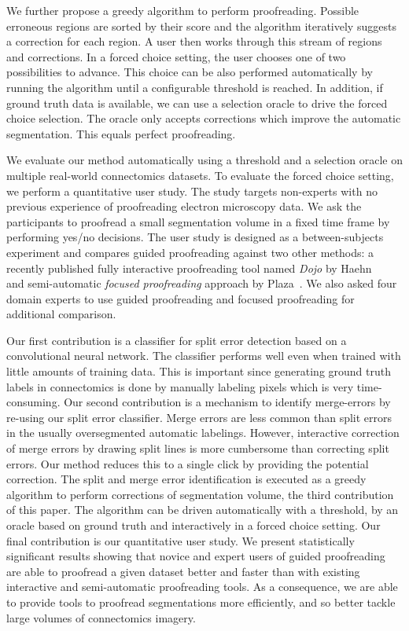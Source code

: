 We further propose a greedy algorithm to perform proofreading. Possible erroneous regions are sorted by their score and the algorithm iteratively suggests a correction for each region. A user then works through this stream of regions and corrections. In a  forced choice setting, the user chooses one of two possibilities to advance. This choice can be also performed automatically by running the algorithm until a configurable threshold is reached. In addition, if ground truth data is available, we can use a selection oracle to drive the forced choice selection. The oracle only accepts corrections which improve the automatic segmentation. This equals perfect proofreading. 

We evaluate our method automatically using a threshold and a selection oracle on multiple real-world connectomics datasets. To evaluate the forced choice setting, we perform a quantitative user study. The study targets non-experts with no previous experience of proofreading electron microscopy data. We ask the participants to proofread a small segmentation volume in a fixed time frame by performing yes/no decisions. The user study is designed as a between-subjects experiment and compares guided proofreading against two other methods: a recently published fully interactive proofreading tool named \textit{Dojo} by Haehn~\etal~\cite{haehn_dojo_2014} and semi-automatic \textit{focused proofreading} approach by Plaza~\cite{focused_proofreading}. We also asked four domain experts to use guided proofreading and focused proofreading for additional comparison.

Our first contribution is a classifier for split error detection based on a convolutional neural network. The classifier performs well even when trained with little amounts of training data. This is important since generating ground truth labels in connectomics is done by manually labeling pixels which is very time-consuming. Our second contribution is a mechanism to identify merge-errors by re-using our split error classifier. Merge errors are less common than split errors in the usually oversegmented automatic labelings. However, interactive correction of merge errors by drawing split lines is more cumbersome than correcting split errors. Our method reduces this to a single click by providing the potential correction. The split and merge error identification is executed as a greedy algorithm to perform corrections of segmentation volume, the third contribution of this paper. The algorithm can be driven automatically with a threshold, by an oracle based on ground truth and interactively in a forced choice setting. Our final contribution is our quantitative user study. We present statistically significant results showing that novice and expert users of guided proofreading are able to proofread a given dataset better and faster than with existing interactive and semi-automatic proofreading tools. As a consequence, we are able to provide tools to proofread segmentations more efficiently, and so better tackle large volumes of connectomics imagery.



